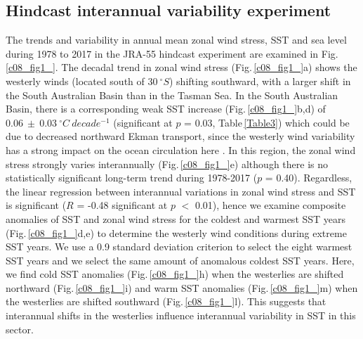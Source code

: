 \documentclass[draft,linenumbers]{agujournal2018}
\begin{document}
\subsection{Hindcast interannual variability experiment}
The trends and variability in annual mean zonal wind stress, SST and sea level during 1978 to 2017 in the JRA-55 hindcast experiment are examined in Fig.\,\ref{c08_fig1_}. The decadal trend in zonal wind stress (Fig.\,\ref{c08_fig1_}a) shows the westerly winds (located south of $30\ ^{\circ}S$) shifting southward, with a larger shift in the South Australian Basin than in the Tasman Sea. In the South Australian Basin, there is a corresponding weak SST increase (Fig.\,\ref{c08_fig1_}b,d) of $0.06\ \pm\ 0.03\ ^{\circ}C\ decade^{-1}$ (significant at $p$ = 0.03, Table\,\ref{Table3}) which could be due to decreased northward Ekman transport, since the westerly wind variability has a strong impact on the ocean circulation here \citep{Middleton2007}. In this region, the zonal wind stress strongly varies interannually (Fig.\,\ref{c08_fig1_}e) although there is no statistically significant long-term trend during 1978-2017 ($p$ = 0.40). Regardless, the linear regression between interannual variations in zonal wind stress and SST is significant ($R$ = -0.48 significant at $p$ $<$ 0.01), hence we examine composite anomalies of SST and zonal wind stress for the coldest and warmest SST years (Fig.\,\ref{c08_fig1_}d,e) to determine the westerly wind conditions during extreme SST years. We use a 0.9 standard deviation criterion to select the eight warmest SST years and we select the same amount of anomalous coldest SST years. Here, we find cold SST anomalies (Fig.\,\ref{c08_fig1_}h) when the westerlies are shifted northward (Fig.\,\ref{c08_fig1_}i) and warm SST anomalies (Fig.\,\ref{c08_fig1_}m) when the westerlies are shifted southward (Fig.\,\ref{c08_fig1_}l). This suggests that interannual shifts in the westerlies influence interannual variability in SST in this sector.
\end{document}
